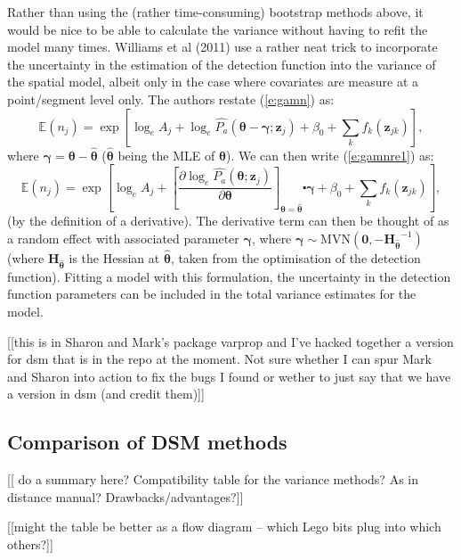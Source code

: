 \documentclass[useAMS,referee]{biom}
\begin{document}
Rather than using the (rather time-consuming) bootstrap methods above, it would be nice to be able to calculate the variance without having to refit the model many times. Williams et al (2011) use a rather neat trick to incorporate the uncertainty in the estimation of the detection function into the variance of the spatial model, albeit only in the case where covariates are measure at a point/segment level only. The authors restate (\ref{e:gamn}) as:
\begin{equation}
\mathbb{E}(n_j) = \exp\left[ \log_eA_j + \log_e \hat{P_a}(\bm{\theta} - \bm{\gamma}; \mathbf{z}_j) + \beta_0 + \sum_k f_k\left(\bm{z}_{jk}\right) \right],
\label{e:gamnre1}
\end{equation}
where $\bm{\gamma} = \bm{\theta} - \bm{\hat{\theta}}$ ($\bm{\hat{\theta}}$ being the MLE of $\bm{\theta}$). We can then write (\ref{e:gamnre1}) as:
\begin{equation*}
\mathbb{E}(n_j) = \exp\left[ \log_eA_j +  \left[ \frac{\partial \log_e \hat{P_a}(\bm{\theta}; \mathbf{z}_j)}{\partial \bm{\theta} }\right]_{\bm{\theta} = \bm{\hat{\theta}}}\centerdot \bm{\gamma}  + \beta_0 + \sum_k f_k\left(\bm{z}_{jk}\right) \right],
\end{equation*}
(by the definition of a derivative). The derivative term can then be thought of as a random effect with associated parameter $\bm{\gamma}$, where $\bm{\gamma} \sim \text{MVN}(\bm{0}, -\bm{H_{\hat{\theta}}}^{-1})$ (where $\bm{H_{\hat{\theta}}}$ is the Hessian at $\bm{\hat{\theta}}$, taken from the optimisation of the detection function). Fitting a model with this formulation, the uncertainty in the detection function parameters can be included in the total variance estimates for the model.

[[this is in Sharon and Mark's package varprop and I've hacked together a version for dsm that is in the repo at the moment. Not sure whether I can spur Mark and Sharon into action to fix the bugs I found or wether to just say that we have a version in dsm (and credit them)]]

\subsection{Comparison of DSM methods}

[[ do a summary here? Compatibility table for the variance methods? As in distance manual? Drawbacks/advantages?]]

[[might the table be better as a flow diagram -- which Lego bits plug into which others?]]
\end{document}
